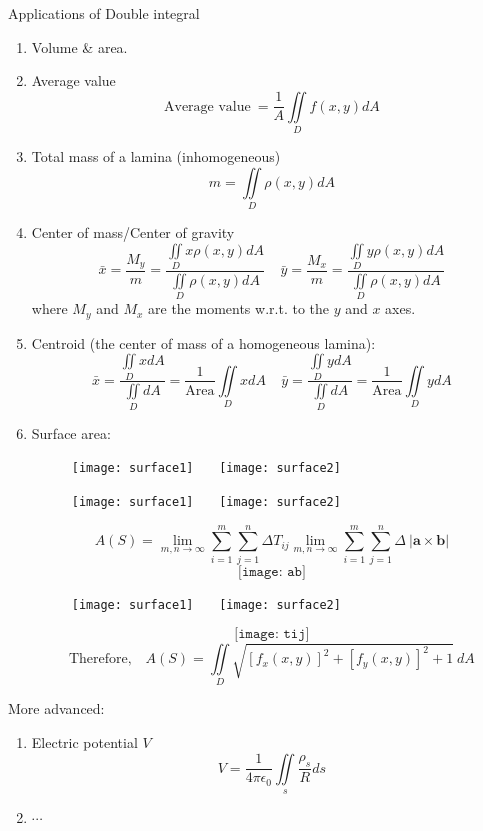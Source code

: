 \documentclass[10pt]{beamer}
\begin{document}
\begin{frame}[allowframebreaks]{Applications of Double integral}
\begin{enumerate}
	\item Volume \& area.
	\item Average value
	$$\text{Average value} ~= \dfrac{1}{A} \iint\limits_D f(x,y) dA$$
	\item Total mass of a lamina (inhomogeneous)
	$$m = \iint\limits_D \rho (x,y) dA$$
	\item Center of mass/Center of gravity
	$$\bar{x} = \dfrac{M_y}{m} = \dfrac{\iint\limits_D x\rho(x,y)dA}{\iint\limits_D\rho(x,y)dA} ~~~~~ \bar{y} = \dfrac{M_x}{m} = \dfrac{\iint\limits_D y\rho(x,y)dA}{\iint\limits_D\rho(x,y)dA}$$
	where $M_y$ and $M_x$ are the moments w.r.t. to the $y$ and $x$ axes.
	\item Centroid (the center of mass of a homogeneous lamina):
	$$\bar{x} = \dfrac{\iint\limits_DxdA}{\iint\limits_DdA} = \dfrac{1}{\text{Area}} \iint\limits_DxdA ~~~~~ \bar{y} = \dfrac{\iint\limits_DydA}{\iint\limits_DdA} = \dfrac{1}{\text{Area}} \iint\limits_DydA$$
	\item Surface area:
	\begin{figure}[H]
		\centering
		\texttt{[image: surface1]} ~~~\texttt{[image: surface2]}
	\end{figure}
		\begin{figure}[H]
			\centering
			\texttt{[image: surface1]} ~~~\texttt{[image: surface2]}
		\end{figure}
		$$A(S) = \lim\limits_{m,n\rightarrow \infty} \sum_{i = 1}^{m}\sum_{j = 1}^{n}\Delta T_{ij}\lim\limits_{m,n\rightarrow \infty} \sum_{i = 1}^{m}\sum_{j = 1}^{n}\Delta ~|\mathbf{a}\times\mathbf{b}|$$
		$$\texttt{[image: ab]}$$
			\begin{figure}[H]
				\centering
				\texttt{[image: surface1]} ~~~\texttt{[image: surface2]}
			\end{figure}
			$$\texttt{[image: tij]}$$
			$$\text{Therefore, }~~~A(S) = \iint\limits_D\sqrt{[f_x(x,y)]^2 + [f_y(x,y)]^2 + 1}~dA$$
\end{enumerate}

More advanced:
\begin{enumerate}
	\item Electric potential $V$
	$$V = \dfrac{1}{4\pi\epsilon_0}\iint\limits_s\dfrac{\rho_s}{R}ds$$
	\item $\cdots$
\end{enumerate}
	
	
\end{frame}
\end{document}
